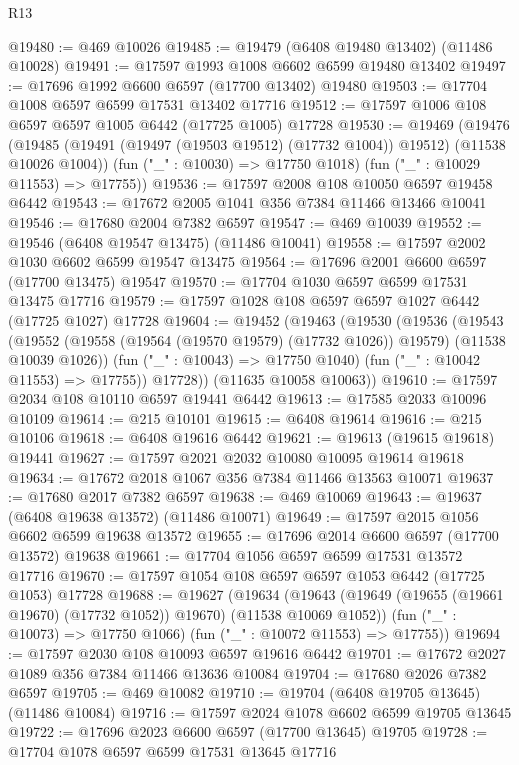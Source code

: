 \begin{lexlean}{R13}
\begin{coremodule}
@19480 := @469 @10026
@19485 := @19479 (@6408 @19480 @13402) (@11486 @10028)
@19491 := @17597 @1993 @1008 @6602 @6599 @19480 @13402
@19497 := @17696 @1992 @6600 @6597 (@17700 @13402) @19480
@19503 := @17704 @1008 @6597 @6599 @17531 @13402 @17716
@19512 := @17597 @1006 @108 @6597 @6597 @1005 @6442 (@17725 @1005) @17728
@19530 := @19469
    (@19476
      (@19485 (@19491 (@19497 (@19503 @19512) (@17732 @1004)) @19512) (@11538 @10026 @1004))
      (fun ("_" : @10030) => @17750 @1018)
      (fun ("_" : @10029 @11553) => @17755))
@19536 := @17597 @2008 @108 @10050 @6597 @19458 @6442
@19543 := @17672 @2005 @1041 @356 @7384 @11466 @13466 @10041
@19546 := @17680 @2004 @7382 @6597
@19547 := @469 @10039
@19552 := @19546 (@6408 @19547 @13475) (@11486 @10041)
@19558 := @17597 @2002 @1030 @6602 @6599 @19547 @13475
@19564 := @17696 @2001 @6600 @6597 (@17700 @13475) @19547
@19570 := @17704 @1030 @6597 @6599 @17531 @13475 @17716
@19579 := @17597 @1028 @108 @6597 @6597 @1027 @6442 (@17725 @1027) @17728
@19604 := @19452
    (@19463
      (@19530
        (@19536
          (@19543
            (@19552 (@19558 (@19564 (@19570 @19579) (@17732 @1026)) @19579) (@11538 @10039 @1026))
            (fun ("_" : @10043) => @17750 @1040)
            (fun ("_" : @10042 @11553) => @17755))
          @17728))
      (@11635 @10058 @10063))
@19610 := @17597 @2034 @108 @10110 @6597 @19441 @6442
@19613 := @17585 @2033 @10096 @10109
@19614 := @215 @10101
@19615 := @6408 @19614
@19616 := @215 @10106
@19618 := @6408 @19616 @6442
@19621 := @19613 (@19615 @19618) @19441
@19627 := @17597 @2021 @2032 @10080 @10095 @19614 @19618
@19634 := @17672 @2018 @1067 @356 @7384 @11466 @13563 @10071
@19637 := @17680 @2017 @7382 @6597
@19638 := @469 @10069
@19643 := @19637 (@6408 @19638 @13572) (@11486 @10071)
@19649 := @17597 @2015 @1056 @6602 @6599 @19638 @13572
@19655 := @17696 @2014 @6600 @6597 (@17700 @13572) @19638
@19661 := @17704 @1056 @6597 @6599 @17531 @13572 @17716
@19670 := @17597 @1054 @108 @6597 @6597 @1053 @6442 (@17725 @1053) @17728
@19688 := @19627
    (@19634
      (@19643 (@19649 (@19655 (@19661 @19670) (@17732 @1052)) @19670) (@11538 @10069 @1052))
      (fun ("_" : @10073) => @17750 @1066)
      (fun ("_" : @10072 @11553) => @17755))
@19694 := @17597 @2030 @108 @10093 @6597 @19616 @6442
@19701 := @17672 @2027 @1089 @356 @7384 @11466 @13636 @10084
@19704 := @17680 @2026 @7382 @6597
@19705 := @469 @10082
@19710 := @19704 (@6408 @19705 @13645) (@11486 @10084)
@19716 := @17597 @2024 @1078 @6602 @6599 @19705 @13645
@19722 := @17696 @2023 @6600 @6597 (@17700 @13645) @19705
@19728 := @17704 @1078 @6597 @6599 @17531 @13645 @17716

\end{coremodule}
\end{lexlean}
